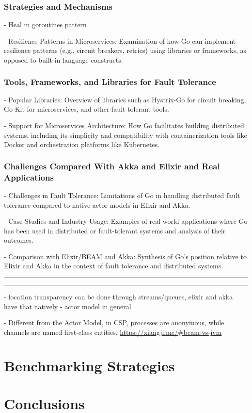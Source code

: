 \subsubsection{Strategies and Mechanisms}

- Heal in goroutines pattern

- Resilience Patterns in Microservices: Examination of how Go can implement resilience patterns (e.g., circuit breakers, retries) using libraries or frameworks, as opposed to built-in language constructs.

\subsubsection{Tools, Frameworks, and Libraries for Fault Tolerance}

- Popular Libraries: Overview of libraries such as Hystrix-Go for circuit breaking, Go-Kit for microservices, and other fault-tolerant tools.

- Support for Microservices Architecture: How Go facilitates building distributed systems, including its simplicity and compatibility with containerization tools like Docker and orchestration platforms like Kubernetes.

\subsubsection{Challenges Compared With Akka and Elixir and Real Applications}

- Challenges in Fault Tolerance: Limitations of Go in handling distributed fault tolerance compared to native actor models in Elixir and Akka.

- Case Studies and Industry Usage: Examples of real-world applications where Go has been used in distributed or fault-tolerant systems and analysis of their outcomes.

- Comparison with Elixir/BEAM and Akka: Synthesis of Go’s position relative to Elixir and Akka in the context of fault tolerance and distributed systems.

\hrule
\hrule

- location transparency can be done through streams/queues, elixir and akka have that natively - actor model in general

- Different from the Actor Model, in CSP, processes are anonymous, while channels are named first-class entities. \url{https://xiangji.me/#beam-vs-jvm}


\section{Benchmarking Strategies}





\section{Conclusions}